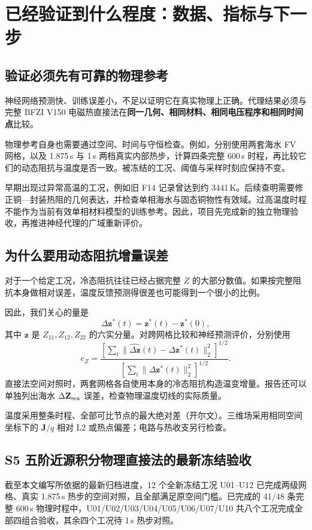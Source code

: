 \chapter{已经验证到什么程度：数据、指标与下一步}
\label{ch:validation}

\section{验证必须先有可靠的物理参考}
神经网络预测快、训练误差小，不足以证明它在真实物理上正确。代理结果必须与完整 BFZI V150 电磁热直接法在\textbf{同一几何、相同材料、相同电压程序和相同时间点}比较。

物理参考自身也需要通过空间、时间与守恒检查。例如，分别使用两套海水 FV 网格，以及 1.875\,s 与 1\,s 两档真实内部热步，计算四条完整 600\,s 时程，再比较它们的动态阻抗与温度是否一致。被冻结的工况、阈值与采样时刻应保持不变。

早期出现过异常高温的工况，例如旧 F14 记录曾达到约 3441\,K。后续查明需要修正铜—封装热阻的几何表达，并检查单相海水与固态铜物性有效域。过高温度时程不能作为当前有效单相材料模型的训练参考。因此，项目先完成新的独立物理验收，再推进神经代理的广域重新评价。

\section{为什么要用动态阻抗增量误差}
对于一个给定工况，冷态阻抗往往已经占据完整 $Z$ 的大部分数值。如果按完整阻抗本身做相对误差，温度反馈预测得很差也可能得到一个很小的比例。

因此，我们关心的量是
\[
\Delta\mathbf z^*(t)=\mathbf z^*(t)-\mathbf z^*(0),
\]
其中 $\mathbf z$ 是 $Z_{11},Z_{12},Z_{22}$ 的六实分量。对跨网格比较和神经预测评价，分别使用
\begin{equation}
e_Z=
\frac{\left[\sum_t\|
\widehat{\Delta\mathbf z}(t)-\Delta\mathbf z^*(t)
\|_2^2\right]^{1/2}}
{\left[\sum_t\|\Delta\mathbf z^*(t)\|_2^2\right]^{1/2}}.
\end{equation}
直接法空间对照时，两套网格各自使用本身的冷态阻抗构造温变增量。报告还可以单独列出海水 $\Delta\mathbf Z_{\mathrm{sea}}$ 误差，检查物理温度切线的实际质量。

温度采用整条时程、全部可比节点的最大绝对差（开尔文）。三维场采用相同空间坐标下的 $\mathbf J/q$ 相对 L2 或热点偏差；电路与热收支另行检查。

\section{S5 五阶近源积分物理直接法的最新冻结验收}
截至本文编写所依据的最新归档进度，12 个全新冻结工况 U01--U12 已完成两级网格、真实 1.875\,s 热步的空间对照，且全部满足原空间门槛。已完成的 41/48 条完整 600\,s 物理时程中，U01/U02/U03/U04/U05/U06/U07/U10 共八个工况完成全部四组合验收，其余四个工况待 1\,s 热步对照。

